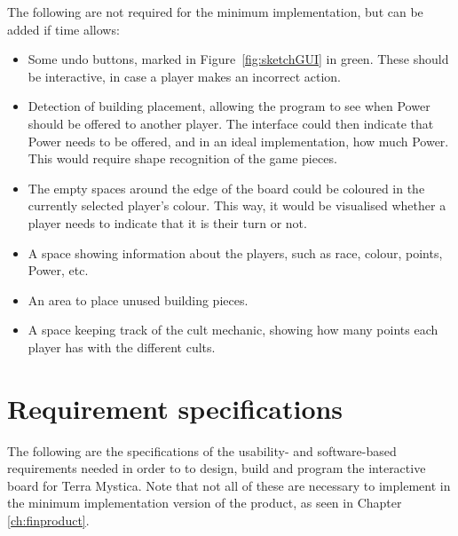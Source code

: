 The following are not required for the minimum implementation, but can be added if time allows:
\begin{itemize}
\item Some undo buttons, marked in Figure~\ref{fig:sketchGUI} in green. These should be interactive, in case a player makes an incorrect action.
\item Detection of building placement, allowing the program to see when Power should be offered to another player. The interface could then indicate that Power needs to be offered, and in an ideal implementation, how much Power. This would require shape recognition of the game pieces.
\item The empty spaces around the edge of the board could be coloured in the currently selected player's colour. This way, it would be visualised whether a player needs to indicate that it is their turn or not.
\item A space showing information about the players, such as race, colour, points, Power, etc.
\item An area to place unused building pieces.
\item A space keeping track of the cult mechanic, showing how many points each player has with the different cults.
\end{itemize}

\section{Requirement specifications}\label{sec:ReqSpec}
The following are the specifications of the usability- and software-based requirements needed in order to to design, build and program the interactive board for Terra Mystica. Note that not all of these are necessary to implement in the minimum implementation version of the product, as seen in Chapter \ref{ch:finproduct}.

